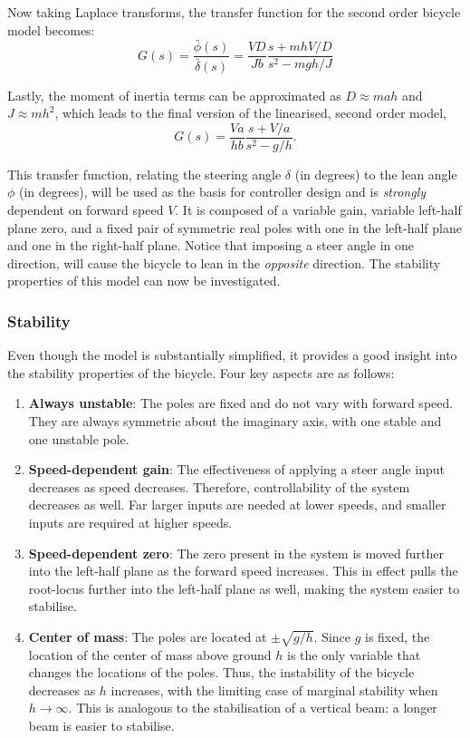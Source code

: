 Now taking Laplace transforms, the transfer function for the second order bicycle model becomes:
\begin{equation}
G(s) = \frac{\bar{\phi}(s)}{\bar{\delta}(s)} =  \frac{V D}{J b} \frac{s + m h V / D}{s^2 - m g h / J}
\end{equation}

Lastly, the moment of inertia terms can be approximated as $D \approx m a h$ and $J \approx m h^2$, which leads to the final version of the linearised, second order model,
\begin{equation}
G(s) = \frac{V a}{h b} \frac{s + V/a}{s^2 - g/h}.
\label{eq:2ndOrder}
\end{equation}

This transfer function, relating the steering angle $\delta$ (in degrees) to the lean angle $\phi$ (in degrees), will be used as the basis for controller design and is \textit{strongly} dependent on forward speed $V$. It is composed of a variable gain, variable left-half plane zero, and a fixed pair of symmetric real poles with one in the left-half plane and one in the right-half plane. Notice that imposing a steer angle in one direction, will cause the bicycle to lean in the \textit{opposite} direction. The stability properties of this model can now be investigated. 

\subsubsection{Stability}
Even though the model is substantially simplified, it provides a good insight into the stability properties of the bicycle. Four key aspects are as follows:

\begin{enumerate}
\item{\textbf{Always unstable}: The poles are fixed and do not vary with forward speed. They are always symmetric about the imaginary axis, with one stable and one unstable pole.}
\item{\textbf{Speed-dependent gain}: The effectiveness of applying a steer angle input decreases as speed decreases. Therefore, controllability of the system decreases as well. Far larger inputs are needed at lower speeds, and smaller inputs are required at higher speeds.}
\item{\textbf{Speed-dependent zero}: The zero present in the system is moved further into the left-half plane as the forward speed increases. This in effect pulls the root-locus further into the left-half plane as well, making the system easier to stabilise.}
\item{\textbf{Center of mass}: The poles are located at $\pm \sqrt{g/h}$. Since $g$ is fixed, the location of the center of mass above ground $h$ is the only variable that changes the locations of the poles. Thus, the instability of the bicycle decreases as $h$ increases, with the limiting case of marginal stability when $h \rightarrow \infty$. This is analogous to the stabilisation of a vertical beam: a longer beam is easier to stabilise.}
\end{enumerate}

